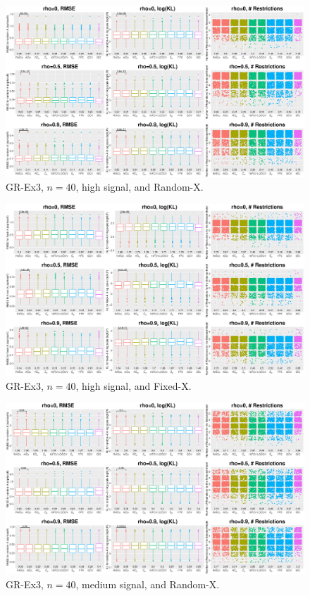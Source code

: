 \clearpage
\begin{figure}[!ht]
\centering
\includegraphics[width=\textwidth]{figures/supplement/randomx_GR-Ex3_n40_hsnr.eps}
\caption{GR-Ex3, $n=40$, high signal, and Random-X.}
\end{figure}
\begin{figure}[!ht]
\centering
\includegraphics[width=\textwidth]{figures/supplement/fixedx_GR-Ex3_n40_hsnr.eps}
\caption{GR-Ex3, $n=40$, high signal, and Fixed-X.}
\end{figure}
\clearpage
\begin{figure}[!ht]
\centering
\includegraphics[width=\textwidth]{figures/supplement/randomx_GR-Ex3_n40_msnr.eps}
\caption{GR-Ex3, $n=40$, medium signal, and Random-X.}
\end{figure}
